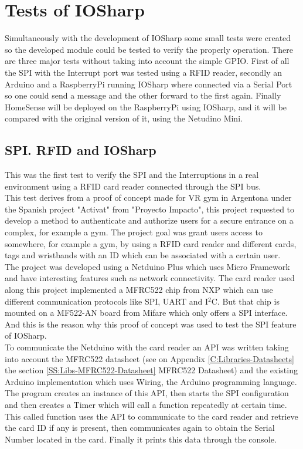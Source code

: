 \chapter{Tests of IOSharp}\label{C:IOSharp Implementation}
Simultaneously with the development of IOSharp some small tests were created so the developed module could be tested to verify the properly operation. There are three major tests without taking into account the simple GPIO. First of all the SPI with the Interrupt port was tested using a RFID reader, secondly an Arduino and a RaspberryPi running IOSharp where connected via a Serial Port so one could send a message and the other forward to the first again. Finally HomeSense will be deployed on the RaspberryPi using IOSharp, and it will be compared with the original version of it, using the Netudino Mini.

\section{SPI. RFID and IOSharp}\label{S:rfid-iosharp}
This was the first test to verify the SPI and the Interruptions in a real environment using a RFID card reader connected through the SPI bus.
\\
This test derives from a proof of concept made for VR gym in Argentona under the Spanish project "Activat" from "Proyecto Impacto", this project requested to develop a method to authenticate and authorize users for a secure entrance on a complex, for example a gym. The project goal was grant users access to somewhere, for example a gym, by using a RFID card reader and different cards, tags and wristbands with an ID which can be associated with a certain user.
\\
The project was developed using a Netduino Plus which uses Micro Framework and have interesting features such as network connectivity. The card reader used along this project implemented a MFRC522 chip from NXP which can use different communication protocols like SPI, UART and I$^{2}$C. But that chip is mounted on a MF522-AN board from Mifare which only offers a SPI interface. And this is the reason why this proof of concept was used to test the SPI feature of IOSharp.
\\
To communicate the Netduino with the card reader an API was written taking into account the MFRC522 datasheet (see on Appendix \ref{C:Libraries-Datasheets} the section \ref{SS:Libs-MFRC522-Datasheet} MFRC522 Datasheet) and the existing Arduino implementation which uses Wiring, the Arduino programming language. The program creates an instance of this API, then starts the SPI configuration and then creates a Timer which will call a function repeatedly at certain time. This called function uses the API to communicate to the card reader and retrieve the card ID if any is present, then communicates again to obtain the Serial Number located in the card. Finally it prints this data through the console.


